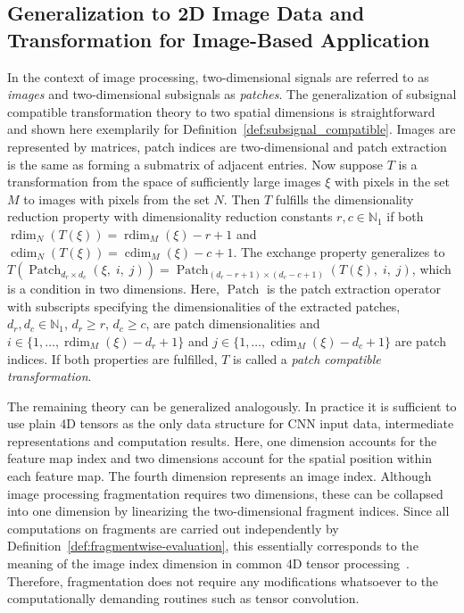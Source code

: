 \documentclass[journal]{IEEEtran}
\newcommand{\N}{\mathbb{N}}
\newcommand{\discint}[2]{\{#1,\dotsc,#2\}}
\newcommand{\inint}[2]{\in\discint{#1}{#2}}
\DeclareMathOperator{\rdim}{rdim}
\DeclareMathOperator{\cdim}{cdim}
\DeclareMathOperator{\Patch}{Patch}
\begin{document}
\subsection{Generalization to 2D Image Data and Transformation for Image-Based Application}
\label{sect:generalization_image_data}
In the context of image processing, two-dimensional signals are referred to as \emph{images} and two-dimensional subsignals as \emph{patches}.
The generalization of subsignal compatible transformation theory to two spatial dimensions is straightforward and shown here exemplarily for Definition~\ref{def:subsignal_compatible}.
Images are represented by matrices, patch indices are two-dimensional and patch extraction is the same as forming a submatrix of adjacent entries.
Now suppose $T$ is a transformation from the space of sufficiently large images $\xi$ with pixels in the set $M$ to images with pixels from the set $N$.
Then $T$ fulfills the dimensionality reduction property with dimensionality reduction constants $r,c\in\N_1$ if both $\rdim_N(T(\xi)) = \rdim_M(\xi) - r + 1$ and $\cdim_N(T(\xi)) = \cdim_M(\xi) - c + 1$.
The exchange property generalizes to $T(\Patch_{d_r\times d_c}(\xi,\;i,\;j)) = \Patch_{(d_r - r + 1)\times(d_c - c + 1)}(T(\xi),\;i,\;j)$, which is a condition in two dimensions.
Here, $\Patch$ is the patch extraction operator with subscripts specifying the dimensionalities of the extracted patches, $d_r,d_c\in\N_1$, $d_r\geq r$, $d_c\geq c$, are patch dimensionalities and $i\inint{1}{\rdim_M(\xi) - d_r + 1}$ and $j\inint{1}{\cdim_M(\xi) - d_c + 1}$ are patch indices.
If both properties are fulfilled, $T$ is called a \emph{patch compatible transformation}.

The remaining theory can be generalized analogously.
In practice it is sufficient to use plain 4D tensors as the only data structure for CNN input data, intermediate representations and computation results.
Here, one dimension accounts for the feature map index and two dimensions account for the spatial position within each feature map.
The fourth dimension represents an image index.
Although image processing fragmentation requires two dimensions, these can be collapsed into one dimension by linearizing the two-dimensional fragment indices.
Since all computations on fragments are carried out independently by Definition~\ref{def:fragmentwise-evaluation}, this essentially corresponds to the meaning of the image index dimension in common 4D tensor processing~\cite{Chetlur2014}.
Therefore, fragmentation does not require any modifications whatsoever to the computationally demanding routines such as tensor convolution.
\end{document}
